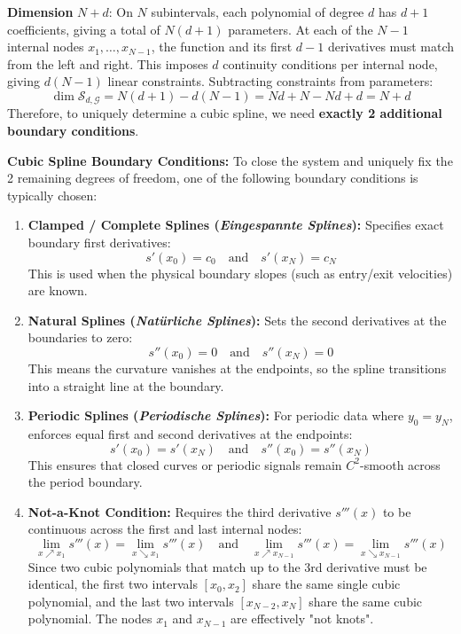 \begin{remark}
    \textbf{Dimension} $N + d$: On $N$ subintervals, each polynomial of degree $d$ has $d+1$ coefficients, giving a total of $N(d+1)$ parameters. At each of the $N-1$ internal nodes $x_1, \dots, x_{N-1}$, the function and its first $d-1$ derivatives must match from the left and right. This imposes $d$ continuity conditions per internal node, giving $d(N-1)$ linear constraints. Subtracting constraints from parameters:
    $$\dim \mathcal{S}_{d,\mathcal{G}} = N(d+1) - d(N-1) = Nd + N - Nd + d = N + d$$
    Therefore, to uniquely determine a cubic spline, we need \textbf{exactly 2 additional boundary conditions}.
\end{remark}

\begin{definition}
    \textbf{Cubic Spline Boundary Conditions:} To close the system and uniquely fix the 2 remaining degrees of freedom, one of the following boundary conditions is typically chosen:
    \begin{enumerate}
        \item \textbf{Clamped / Complete Splines (\textit{Eingespannte Splines}):} Specifies exact boundary first derivatives:
        $$s'(x_0) = c_0 \quad \text{and} \quad s'(x_N) = c_N$$
        This is used when the physical boundary slopes (such as entry/exit velocities) are known.

        \item \textbf{Natural Splines (\textit{Natürliche Splines}):} Sets the second derivatives at the boundaries to zero:
        $$s''(x_0) = 0 \quad \text{and} \quad s''(x_N) = 0$$
        This means the curvature vanishes at the endpoints, so the spline transitions into a straight line at the boundary.

        \item \textbf{Periodic Splines (\textit{Periodische Splines}):} For periodic data where $y_0 = y_N$, enforces equal first and second derivatives at the endpoints:
        $$s'(x_0) = s'(x_N) \quad \text{and} \quad s''(x_0) = s''(x_N)$$
        This ensures that closed curves or periodic signals remain $C^2$-smooth across the period boundary.

        \item \textbf{Not-a-Knot Condition:} Requires the third derivative $s'''(x)$ to be continuous across the first and last internal nodes:
        $$\lim_{x \nearrow x_1} s'''(x) = \lim_{x \searrow x_1} s'''(x) \quad \text{and} \quad \lim_{x \nearrow x_{N-1}} s'''(x) = \lim_{x \searrow x_{N-1}} s'''(x)$$
        Since two cubic polynomials that match up to the 3rd derivative must be identical, the first two intervals $[x_0, x_2]$ share the same single cubic polynomial, and the last two intervals $[x_{N-2}, x_N]$ share the same cubic polynomial. The nodes $x_1$ and $x_{N-1}$ are effectively "not knots".
    \end{enumerate}
\end{definition}

